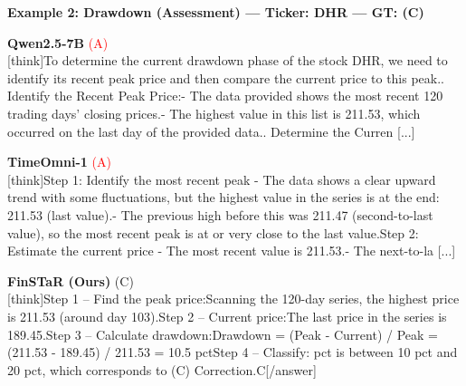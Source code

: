 \noindent
\textbf{Example 2: Drawdown (Assessment) --- Ticker: DHR --- GT: (C)}
\vspace{2pt}

\noindent
\begin{minipage}[t]{0.28\textwidth}
\colorbox{red!8}{\parbox{\dimexpr\textwidth-2\fboxsep}{
\textbf{Qwen2.5-7B} \textcolor{red}{(A)} \\[2pt]
\tiny
[think]\newline To determine the current drawdown phase of the stock DHR, we need to identify its recent peak price and then compare the current price to this peak.. Identify the Recent Peak Price:\newline    - The data provided shows the most recent 120 trading days' closing prices.\newline    - The highest value in this list is 211.53, which occurred on the last day of the provided data.. Determine the Curren [...]
}}
\end{minipage}
\hfill
\begin{minipage}[t]{0.28\textwidth}
\colorbox{red!8}{\parbox{\dimexpr\textwidth-2\fboxsep}{
\textbf{TimeOmni-1} \textcolor{red}{(A)} \\[2pt]
\tiny
[think]\newline Step 1: Identify the most recent peak  \newline - The data shows a clear upward trend with some fluctuations, but the highest value in the series is at the end: 211.53 (last value).\newline - The previous high before this was 211.47 (second-to-last value), so the most recent peak is at or very close to the last value.\newline Step 2: Estimate the current price  \newline - The most recent value is 211.53.\newline - The next-to-la [...]
}}
\end{minipage}
\hfill
\begin{minipage}[t]{0.41\textwidth}
\colorbox{green!10}{\parbox{\dimexpr\textwidth-2\fboxsep}{
\textbf{FinSTaR (Ours)} \textcolor{green!50!black}{(C)} \\[2pt]
\tiny
[think]\newline Step 1 -- Find the peak price:\newline Scanning the 120-day series, the highest price is 211.53 (around day 103).\newline Step 2 -- Current price:\newline The last price in the series is 189.45.\newline Step 3 -- Calculate drawdown:\newline Drawdown = (Peak - Current) / Peak = (211.53 - 189.45) / 211.53 = 10.5 pct\newline Step 4 -- Classify: pct is between 10 pct and 20 pct, which corresponds to (C) Correction.\newline [/think]\newline [answer]C[/answer]
}}
\end{minipage}
